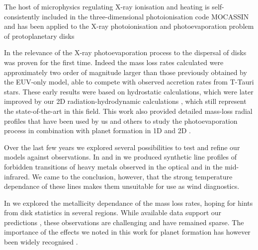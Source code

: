 \documentclass[10pt,fleqn,twoside]{article}
\begin{document}
 The host of microphysics regulating
X-ray ionisation and heating is self-consistently included in the
three-dimensional photoionisation code MOCASSIN 
\citep{2003MNRAS.340.1136E, 2005MNRAS.362.1038E, 2008ApJS..175..534E}
and has been applied to the X-ray photoionisation and
photoevaporation problem of protoplanetary disks 
\citep{2008ApJ...688..398E, 2009ApJ...699.1639E, 
2010MNRAS.406.1553E, 2016MNRAS.460.3472E, 
2010MNRAS.401.1415O, 2011MNRAS.412...13O, 2012MNRAS.422.1880O}


In 
\citet{2008ApJ...688..398E, 2009ApJ...699.1639E}
the relevance of the X-ray photoevaporation process
to the dispersal of disks was proven for the first time. Indeed the mass
loss rates calculated were approximately two order of magnitude larger
than those previously obtained by the EUV-only model, able to compete
with observed accretion rates from T-Tauri stars. These early results
were based on hydrostatic calculations, which were later improved by
our 2D radiation-hydrodynamic calculations 
\citep{2010MNRAS.401.1415O, 2011MNRAS.412...13O, 2012MNRAS.422.1880O},
which still represent the state-of-the-art in
this field. This work also provided detailed mass-loss radial profiles
that have been used by us and others to study the photoevaporation
process in combination with planet formation in 1D and 2D
\citep[e.g.,][]{2013MNRAS.430.1392R, 2015MNRAS.454.2173R, 2015MNRAS.450.3008E}.

Over the last few years we explored several possibilities to test and refine our
models against observations. In 
\citet{2010MNRAS.406.1553E, 2016MNRAS.460.3472E}
and in
\citet{2010MNRAS.401.1636S}
we
produced synthetic line profiles of forbidden transitions of heavy
metals observed in the optical and in the mid-infrared. We came to the
conclusion, however, that the strong temperature dependance of these
lines makes them unsuitable for use as wind diagnostics. 

In 
\citet{2010MNRAS.402.2735E}
we explored the metallicity dependance of the mass
loss rates, hoping for hints from disk statistics in several
regions. While available data support our predictions 
\citep{2009AIPC.1158..171Y, 2010ApJ...723L.113Y},
these observations are challenging and have
remained sparse. The importance of the effects we noted in this
work for planet formation has however been widely recognised
\citep[e.g.,][]{2016arXiv161001170L}.
\end{document}
